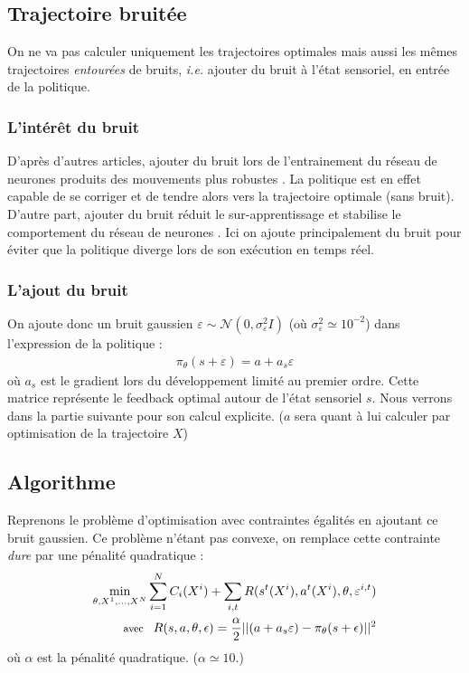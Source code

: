 \documentclass[a4paper,10pt]{article}
\begin{document}
\subsection{Trajectoire bruitée}
On ne va pas calculer uniquement les trajectoires optimales mais aussi les mêmes trajectoires \textit{entourées} de bruits, \textit{i.e.} ajouter du bruit à l'état sensoriel, en entrée de la politique. 
\subsubsection{L'intérêt du bruit}
D'après d'autres articles, ajouter du bruit lors de l'entrainement du réseau de neurones produits des mouvements plus robustes \cite{huh2009real} \cite{wang2010optimizing}. La politique est en effet capable de se corriger et de tendre alors vers la trajectoire optimale (sans bruit). D'autre part, ajouter du bruit réduit le sur-apprentissage \cite{hinton2012improving} et stabilise le comportement du réseau de neurones \cite{hoerzer2014emergence}. Ici on ajoute principalement du bruit pour éviter que la politique diverge lors de son exécution en temps réel. 

\subsubsection{L'ajout du bruit}
On ajoute donc un bruit gaussien $\varepsilon \sim \mathcal{N}(0,\sigma_{\varepsilon}^{2}I)$ (où $\sigma_{\varepsilon}^{2} \simeq 10^{-2}$) dans l'expression de la politique : 
\begin{align*}
  \pi_{\theta}(s + \varepsilon) = a + a_{s}\varepsilon 
\end{align*}
où $a_s$ est le gradient lors du développement limité au premier ordre. Cette matrice représente le feedback optimal autour de l'état sensoriel $s$. Nous verrons dans la partie suivante pour son calcul explicite. ($a$ sera quant à lui calculer par optimisation de la trajectoire $X$)

\subsection{Algorithme}
 Reprenons le problème d'optimisation avec contraintes égalités en ajoutant ce bruit gaussien. Ce problème n'étant pas convexe, on remplace cette contrainte \textit{dure} par une pénalité quadratique : 
 \begin{align*}
  \min_{\theta,X^1,...,X^N} \sum\limits_{i=1}^{N} C_{i}(X^{i}) + \sum\limits_{i,t} R(s^{t}(X^{i}),a^{t}(X^{i}),\theta,\varepsilon^{i,t})\\ \text{\footnotesize avec } \hspace{5pt}
  R(s,a,\theta,\epsilon) = \frac{\alpha}{2}||(a+a_s\varepsilon) - \pi_{\theta}(s+\epsilon)||^2
  \end{align*}
où $\alpha$ est la pénalité quadratique. ($\alpha \simeq 10$.)\\
\end{document}
